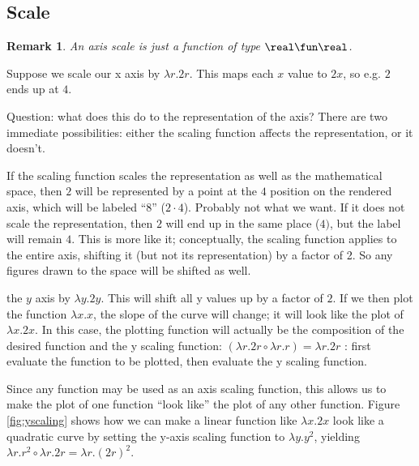 \documentclass[12pt]{tufte-handout}
\numberwithin{equation}{subsection}
\numberwithin{equation}{subsection}
\newtheorem{remark}{Remark}
\begin{document}
  \subsection{Scale}
  \label{subs:axisscale}

  \begin{remark}
    An axis scale is just a function of type \(\real\fun\real\).
  \end{remark}

  Suppose we scale our x axis by \(\lambda r.2r\).  This maps each \(x\)
  value to \(2x\), so e.g. \(2\) ends up at \(4\).

  Question: what does this do to the representation of the axis?  There
  are two immediate possibilities: either the scaling function affects
  the representation, or it doesn't.

  If the scaling function scales the representation as well as the
  mathematical space, then \(2\) will be represented by a point at the \(4\)
  position on the rendered axis, which will be labeled ``8'' (\(2\cdot
  4\)).  Probably not what we want.  If it does not scale the
  representation, then \(2\) will end up in the same place (\(4)\), but
  the label will remain \(4\).  This is more like it; conceptually, the
  scaling function applies to the entire axis, shifting it (but not its
  representation) by a factor of 2.  So any figures drawn to the space
  will be shifted as well.

   the \(y\) axis by \(\lambda y.2y\).
  This will shift all y values up by a factor of \(2\).  If we then plot
  the function \(\lambda x.x\), the slope of the curve will change; it
  will look like the plot of \(\lambda x.2x\).  In this case, the
  plotting function will actually be the composition of the desired
  function and the y scaling function: \((\lambda r.2r\circ\lambda r.r)
  = \lambda r.2r\)%
  : first evaluate the function to be plotted, then
  evaluate the y scaling function.

  Since any function may be used as an axis scaling function, this
  allows us to make the plot of one function ``look like'' the plot of
  any other function.  Figure \ref{fig:yscaling} shows how we can make a
  linear function like \(\lambda x.2x\) look like a quadratic curve by setting the y-axis
  scaling function to \(\lambda y.y^2\), yielding \(\lambda
  r.r^2\circ\lambda r.2r = \lambda r.(2r)^2\).
\end{document}
